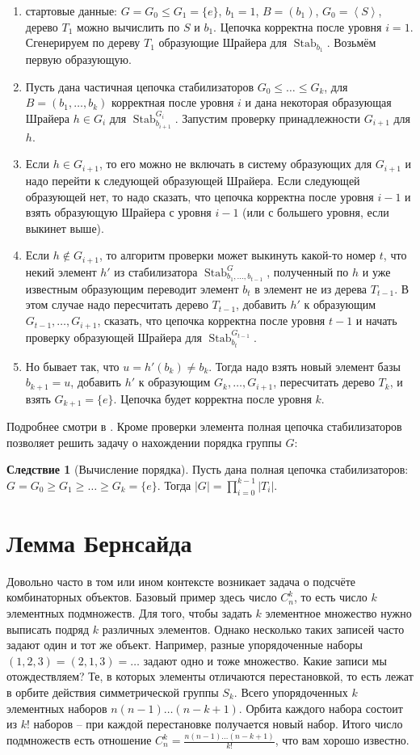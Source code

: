 \documentclass[10pt,a4paper,oneside]{book}
\theoremstyle{definition}
\newtheorem{cor}{\color{green!45!black}Следствие}
\renewcommand{\leq}{\leqslant}
\renewcommand{\geq}{\geqslant}
\newcommand{\Stab}{\operatorname{Stab}}
\def\lan{\left\langle }
\def\ran{\right\rangle}
\def\crl{\begin{cor}}
\def\ecrl{\end{cor}}
\def\enm{\begin{enumerate}}
\def\eenm{\end{enumerate}}
\begin{document}
\enm
\item стартовые данные: $G=G_0 \leq G_1=\{e\}$, $b_1=1$, $B=(b_1)$, $G_0=\lan S\ran$, дерево $T_1$ можно вычислить по $S$  и $b_1$. Цепочка корректна после уровня $i=1$. Сгенерируем по дереву $T_1$ образующие Шрайера для $\Stab_{b_1}$. Возьмём первую образующую.
\item Пусть дана частичная цепочка стабилизаторов $G_0\leq \dots\leq G_k$, для  $B=(b_1,\dots,b_k)$ корректная после уровня $i$ и дана некоторая образующая Шрайера $h\in G_i$ для $\Stab_{b_{i+1}}^{G_i}$. Запустим проверку принадлежности $G_{i+1}$ для $h$. 
\item Если $h\in G_{i+1}$, то его можно не включать в систему образующих для $G_{i+1}$ и надо перейти к следующей образующей Шрайера. Если следующей образующей нет, то надо сказать, что цепочка корректна после уровня $i-1$ и взять образующую Шрайера с уровня $i-1$ (или с большего уровня, если выкинет выше).
\item Если $h\notin G_{i+1}$, то алгоритм проверки может выкинуть какой-то номер $t$, что некий элемент $h'$ из стабилизатора $\Stab_{b_1,\dots,b_{t-1}}^G$, полученный по $h$ и уже известным образующим переводит элемент $b_t$ в элемент не из дерева $T_{t-1}$. В этом случае надо пересчитать дерево $T_{t-1}$, добавить $h'$ к образующим $G_{t-1},\dots,G_{i+1}$, сказать, что цепочка корректна после уровня $t-1$ и начать проверку образующей Шрайера для $\Stab_{b_t}^{G_{t-1}}$. 
\item Но бывает так, что $u=h'(b_k)\neq b_k$. Тогда надо взять новый элемент базы $b_{k+1}=u$, добавить $h'$ к образующим $G_k,\dots,G_{i+1}$, пересчитать дерево $T_k$, и взять $G_{k+1}=\{e\}$. Цепочка будет корректна после уровня $k$.
\eenm


Подробнее смотри в \cite{PGA}. Кроме проверки элемента полная цепочка стабилизаторов позволяет решить задачу о нахождении порядка группы $G$:


\crl[Вычисление порядка] Пусть дана полная цепочка стабилизаторов: $G=G_0\geq G_1\geq \dots \geq G_k=\{e\}$. Тогда $|G|=\prod_{i=0}^{k-1} |T_i|$. 
\ecrl




\section{Лемма Бернсайда}

Довольно часто в том или ином контексте возникает задача о подсчёте комбинаторных объектов. Базовый пример здесь число $C_{n}^k$, то есть число $k$ элементных подмножеств. Для того, чтобы задать $k$ элементное множество нужно выписать подряд $k$ различных элементов. Однако несколько таких записей часто задают один и тот же объект. Например, разные упорядоченные наборы $(1,2,3)=(2,1,3)=\dots$ задают одно и тоже множество. Какие записи мы отождествляем? Те, в которых элементы отличаются перестановкой, то есть лежат в орбите действия симметрической группы $S_k$. Всего упорядоченных $k$ элементных наборов $n(n-1)\dots(n-k+1)$. Орбита каждого набора состоит из $k!$ наборов -- при каждой перестановке получается новый набор. Итого число подмножеств есть отношение $C_n^k=\frac{n(n-1)\dots(n-k+1)}{k!}$, что вам хорошо известно. 
\end{document}
